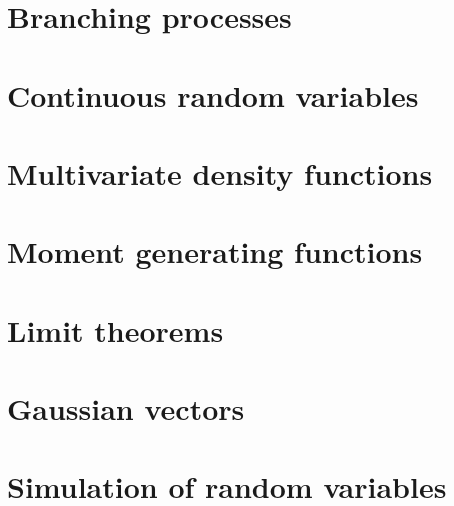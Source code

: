 \documentclass{article}
\begin{document}
\section{Branching processes}

\section{Continuous random variables}

\section{Multivariate density functions}

\section{Moment generating functions}

\section{Limit theorems}

\section{Gaussian vectors}

\section{Simulation of random variables}

\end{document}
